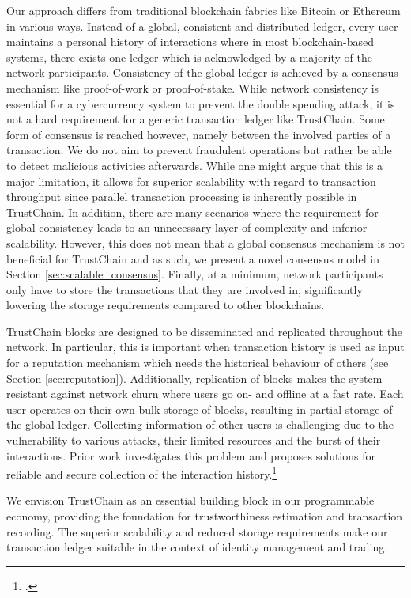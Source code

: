 \documentclass[USenglish]{article}
\begin{document}
Our approach differs from traditional blockchain fabrics like Bitcoin or Ethereum in various ways.
Instead of a global, consistent and distributed ledger, every user maintains a personal history of interactions where in most blockchain-based systems, there exists one ledger which is acknowledged by a majority of the network participants.
Consistency of the global ledger is achieved by a consensus mechanism like proof-of-work or proof-of-stake.
While network consistency is essential for a cybercurrency system to prevent the double spending attack, it is not a hard requirement for a generic transaction ledger like TrustChain.
Some form of consensus is reached however, namely between the involved parties of a transaction.
We do not aim to prevent fraudulent operations but rather be able to detect malicious activities afterwards.
While one might argue that this is a major limitation, it allows for superior scalability with regard to transaction throughput since parallel transaction processing is inherently possible in TrustChain.
In addition, there are many scenarios where the requirement for global consistency leads to an unnecessary layer of complexity and inferior scalability.
However, this does not mean that a global consensus mechanism is not beneficial for TrustChain and as such, we present a novel consensus model in Section \ref{sec:scalable_consensus}.
Finally, at a minimum, network participants only have to store the transactions that they are involved in, significantly lowering the storage requirements compared to other blockchains.

TrustChain blocks are designed to be disseminated and replicated throughout the network.
In particular, this is important when transaction history is used as input for a reputation mechanism which needs the historical behaviour of others (see Section \ref{sec:reputation}).
Additionally, replication of blocks makes the system resistant against network churn where users go on- and offline at a fast rate.
Each user operates on their own bulk storage of blocks, resulting in partial storage of the global ledger.
Collecting information of other users is challenging due to the vulnerability to various attacks, their limited resources and the burst of their interactions.
Prior work investigates this problem and proposes solutions for reliable and secure collection of the interaction history.\footcite{gkoroureducing}

We envision TrustChain as an essential building block in our programmable economy, providing the foundation for trustworthiness estimation and transaction recording.
The superior scalability and reduced storage requirements make our transaction ledger suitable in the context of identity management and trading.
\end{document}
